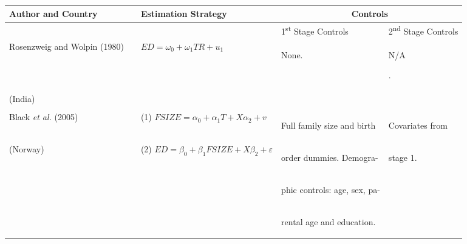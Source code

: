 \documentclass{article}[11pt,subeqn]
\begin{document}
\begin{spacing}{1.5}
\begin{center}
\begin{rotate}{90}
\begin{tabular}{lp{4mm}lll}\toprule
Author and Country& &  Estimation Strategy & \multicolumn{2}{c}{Controls} \\ \midrule
&& & \hspace{5mm}1\textsuperscript{st} Stage Controls & 2\textsuperscript{nd} Stage Controls \\  \cmidrule(r){4-4} \cmidrule{5-5}
Rosenzweig and Wolpin (1980) & &
$ED=\omega_0+\omega_1 TR+u_1$&
\begin{small}None.\end{small}&
\begin{small}N\slash A\end{small}.
\\
(India) & & & &
\\
\begin{footnotesize}\end{footnotesize}&\begin{footnotesize}\end{footnotesize}&\begin{footnotesize}\end{footnotesize}&\begin{footnotesize}\end{footnotesize}&\begin{footnotesize}\end{footnotesize}\\
Black \emph{et al.} (2005) & &
(1) $FSIZE=\alpha_0 + \alpha_1 T + X\alpha_2 + v$ &
\begin{small}Full family size and  birth \end{small}&
\begin{small}Covariates from\end{small}
\\
(Norway) & &
(2) $ED=\beta_0+\beta_1 FSIZE + X\beta_2 + \varepsilon$ &
\begin{small}order dummies. Demogra-\end{small}  &
\begin{small}stage 1.\end{small}
\\
& & &
\begin{small}phic controls: age, sex, pa-\end{small}&
\\
& & &
\begin{small}rental age and education.\end{small}&

\end{tabular}
\end{rotate}
\end{center}
\end{spacing}
\end{document}
